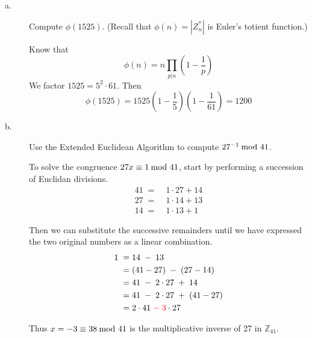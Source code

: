 \documentclass[../hw_sols.tex]{subfiles}
\begin{document}
\begin{description}

\item[a.] Compute $\phi(1525)$. (Recall that $\phi(n) = |Z^*_n|$ is Euler's 
totient function.)

\begin{solution}
Know that 
	\[ \phi(n) = n \prod_{p | n} \left( 1 - \frac{1}{p} \right) \]
We factor $1525 = 5^2 \cdot 61$. Then 
	\[ \phi(1525) 
	= 1525 \left( 1 - \frac{1}{5} \right) \left( 1 - \frac{1}{61} \right) 
	= 1200 \]
\end{solution}

\item[b.] Use the Extended Euclidean Algorithm to compute $27^{-1} \tmod{41}$.

\begin{solution}

To solve the congruence $27x \equiv 1 \tmod{41}$, start by performing a 
succession of Euclidan divisions.
\begin{align*}
	41 \; =& \; 1 \cdot 27 + 14 \\
	27 \; =& \; 1 \cdot 14 + 13 \\
	14 \; =& \; 1 \cdot 13 + 1
\end{align*}

Then we can substitute the successive remainders until we have expressed the 
two original numbers as a linear combination.
\begin{align*}
	1 \; 
	=& \; 14 \; - \; 13 \\
	=& \; (41 - 27) \; - \; (27 - 14) \\
	=& \; 41 \; - \; 2 \cdot 27 \; + \; 14 \\
	=& \; 41 \; - \; 2 \cdot 27 \; + \; (41 - 27) \\
	=& \; 2 \cdot 41 \; {\color{red} - \; 3} \cdot 27
\end{align*}

Thus $x = -3 \equiv 38 \tmod{41}$ is the multiplicative inverse of 27 in 
$\mathbb{Z}_{41}$.

\end{solution}

\end{description}


\newpage


\end{document}
